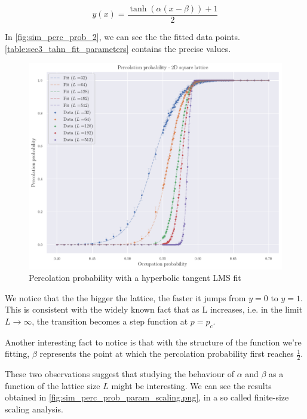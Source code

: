 $$ 
y(x) = \frac{\tanh(\alpha(x - \beta)) + 1}{2}
$$ 

In \autoref{fig:sim_perc_prob_2}, we can see the the fitted data points. \autoref{table:sec3_tahn_fit_parameters} contains the precise values.


\begin{figure}[H]
  \includegraphics[width=\linewidth]{Images/sim_perc_prob_2.png}
  \caption{Percolation probability with a hyperbolic tangent LMS fit}
  \label{fig:sim_perc_prob_2}
\end{figure}

We notice that the the bigger the lattice, the faster it jumps from $y=0$ to $y=1$. This is consistent with the widely known fact that as L increases, i.e. in the limit $L \rightarrow \infty $, the transition becomes a step function at $p = p_c$. 

Another interesting fact to notice is that with the structure of the function we're fitting, $\beta$ represents the point at which the percolation probability first reaches $\frac{1}{2}$.

These two observations suggest that studying the behaviour of $\alpha$ and $\beta$ as a function of the lattice size $L$ might be interesting. We can see the results obtained in \autoref{fig:sim_perc_prob_param_scaling.png}, in a so called finite-size scaling analysis.

